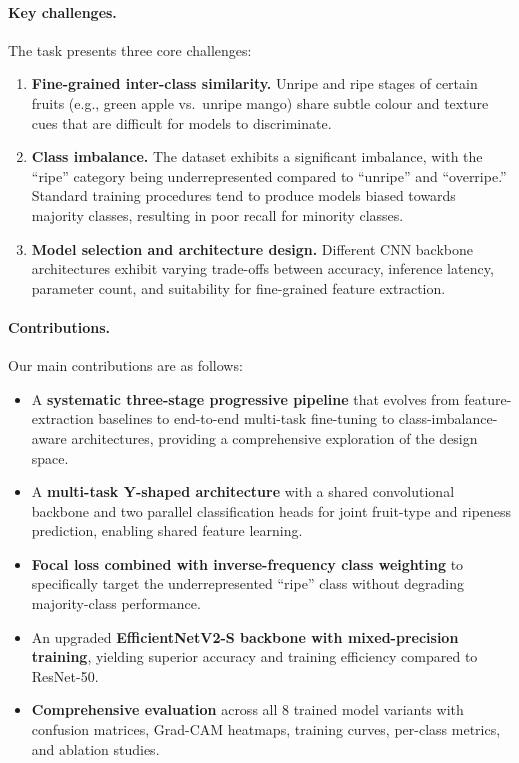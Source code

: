 \documentclass[10pt,twocolumn,letterpaper]{article}
\begin{document}
\paragraph{Key challenges.}
The task presents three core challenges:
\begin{enumerate}
  \item \textbf{Fine-grained inter-class similarity.} Unripe and ripe stages of certain fruits (e.g., green apple vs.\ unripe mango) share subtle colour and texture cues that are difficult for models to discriminate.
  \item \textbf{Class imbalance.} The dataset exhibits a significant imbalance, with the ``ripe'' category being underrepresented compared to ``unripe'' and ``overripe.'' Standard training procedures tend to produce models biased towards majority classes, resulting in poor recall for minority classes.
  \item \textbf{Model selection and architecture design.} Different CNN backbone architectures exhibit varying trade-offs between accuracy, inference latency, parameter count, and suitability for fine-grained feature extraction.
\end{enumerate}

\paragraph{Contributions.}
Our main contributions are as follows:
\begin{itemize}
  \item A \textbf{systematic three-stage progressive pipeline} that evolves from feature-extraction baselines to end-to-end multi-task fine-tuning to class-imbalance-aware architectures, providing a comprehensive exploration of the design space.
  \item A \textbf{multi-task Y-shaped architecture} with a shared convolutional backbone and two parallel classification heads for joint fruit-type and ripeness prediction, enabling shared feature learning.
  \item \textbf{Focal loss combined with inverse-frequency class weighting} to specifically target the underrepresented ``ripe'' class without degrading majority-class performance.
  \item An upgraded \textbf{EfficientNetV2-S backbone with mixed-precision training}, yielding superior accuracy and training efficiency compared to ResNet-50.
  \item \textbf{Comprehensive evaluation} across all 8 trained model variants with confusion matrices, Grad-CAM heatmaps, training curves, per-class metrics, and ablation studies.
\end{itemize}
\end{document}
